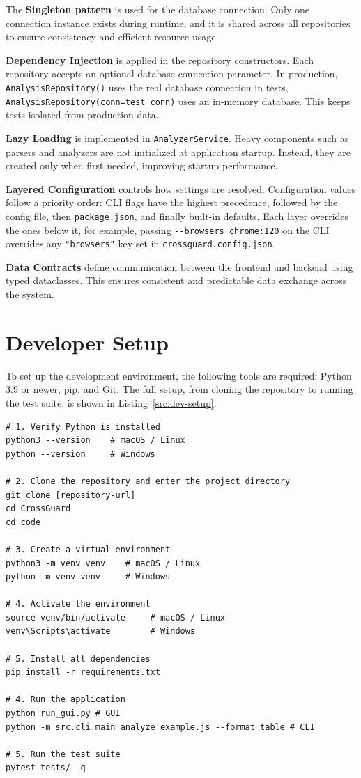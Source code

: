 The \textbf{Singleton pattern} is used for the database connection. Only one connection instance exists during runtime, and it is shared across all repositories to ensure consistency and efficient resource usage.

\textbf{Dependency Injection} is applied in the repository constructors. Each repository accepts an optional database connection parameter. In production, \texttt{AnalysisRepository()} uses the real database connection in tests, \texttt{AnalysisRepository(conn=test\_conn)} uses an in-memory database. This keeps tests isolated from production data.

\textbf{Lazy Loading} is implemented in \texttt{AnalyzerService}. Heavy components such as parsers and analyzers are not initialized at application startup. Instead, they are created only when first needed, improving startup performance.

\textbf{Layered Configuration} controls how settings are resolved. Configuration values follow a priority order: CLI flags have the highest precedence, followed by the config file, then \texttt{package.json}, and finally built-in defaults. Each layer overrides the ones below it, for example, passing \texttt{-{}-browsers chrome:120} on the CLI overrides any \texttt{"browsers"} key set in \texttt{crossguard.config.json}.

\textbf{Data Contracts} define communication between the frontend and backend using typed dataclasses. This ensures consistent and predictable data exchange across the system.

\section{Developer Setup}
\label{sec:setup}

To set up the development environment, the following tools are required: Python 3.9 or newer, pip, and Git. The full setup, from cloning the repository to running the test suite, is shown in Listing~\ref{src:dev-setup}.

\begin{lstlisting}[caption={Complete developer setup: clone, virtual environment, install, run, and test}, label=src:dev-setup, basicstyle=\ttfamily\small, breaklines=true]
# 1. Verify Python is installed
python3 --version    # macOS / Linux
python --version     # Windows

# 2. Clone the repository and enter the project directory
git clone [repository-url]
cd CrossGuard
cd code

# 3. Create a virtual environment
python3 -m venv venv    # macOS / Linux
python -m venv venv     # Windows

# 4. Activate the environment
source venv/bin/activate     # macOS / Linux
venv\Scripts\activate        # Windows

# 5. Install all dependencies
pip install -r requirements.txt

# 4. Run the application
python run_gui.py # GUI
python -m src.cli.main analyze example.js --format table # CLI

# 5. Run the test suite
pytest tests/ -q
\end{lstlisting}

